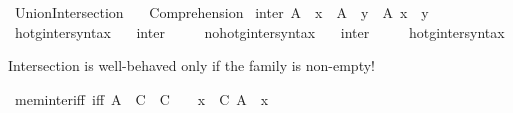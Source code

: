 %
\begin{isabellebody}%
%
%
\isadelimdocument
%
\endisadelimdocument
%
\isatagdocument
\isanewline
\isanewline
%
\isamarkuptrue%
%
\endisatagdocument
{\isafolddocument}%
%
\isadelimdocument
%
\endisadelimdocument
%
\isadelimtheory
%
\endisadelimtheory
%
\isatagtheory
{}\isamarkupfalse%
\ Union{\isacharunderscore}{\kern0pt}Intersection\isanewline
\ \ \ Comprehension\isanewline
{}%
\endisatagtheory
{\isafoldtheory}%
%
\isadelimtheory
\isanewline
%
\endisadelimtheory
\isanewline
{}\isamarkupfalse%
\ {\isachardoublequoteopen}inter\ A\ {\isasymequiv}\ {\isacharbraceleft}{\kern0pt}x\ {\isasymin}\ {\isasymUnion}A\ {\isacharbar}{\kern0pt}\ {\isasymforall}y\ {\isasymin}\ A{\isachardot}{\kern0pt}\ x\ {\isasymin}\ y{\isacharbraceright}{\kern0pt}{\isachardoublequoteclose}\isanewline
\isanewline
{}\isamarkupfalse%
\ hotg{\isacharunderscore}{\kern0pt}inter{\isacharunderscore}{\kern0pt}syntax\ \ \isamarkupfalse%
\ inter\ {\isacharparenleft}{\kern0pt}{\isachardoublequoteopen}{\isasymInter}{\isacharunderscore}{\kern0pt}{\isachardoublequoteclose}\ {\isacharbrackleft}{\kern0pt}{}{}{\isacharbrackright}{\kern0pt}\ {}{}{\isacharparenright}{\kern0pt}\ \isamarkupfalse%
\isanewline
{}\isamarkupfalse%
\ no{\isacharunderscore}{\kern0pt}hotg{\isacharunderscore}{\kern0pt}inter{\isacharunderscore}{\kern0pt}syntax\ \ \isamarkupfalse%
\ inter\ {\isacharparenleft}{\kern0pt}{\isachardoublequoteopen}{\isasymInter}{\isacharunderscore}{\kern0pt}{\isachardoublequoteclose}\ {\isacharbrackleft}{\kern0pt}{}{}{\isacharbrackright}{\kern0pt}\ {}{}{\isacharparenright}{\kern0pt}\ \isamarkupfalse%
\isanewline
{}\isamarkupfalse%
\ hotg{\isacharunderscore}{\kern0pt}inter{\isacharunderscore}{\kern0pt}syntax%
\begin{isamarkuptext}%
Intersection is well-behaved only if the family is non-empty!%
\end{isamarkuptext}\isamarkuptrue%
\isamarkupfalse%
\ mem{\isacharunderscore}{\kern0pt}inter{\isacharunderscore}{\kern0pt}iff\ {\isacharbrackleft}{\kern0pt}iff{\isacharbrackright}{\kern0pt}{\isacharcolon}{\kern0pt}\ {\isachardoublequoteopen}A\ {\isasymin}\ {\isasymInter}C\ {\isasymlongleftrightarrow}\ C\ {\isasymnoteq}\ {\isacharbraceleft}{\kern0pt}{\isacharbraceright}{\kern0pt}\ {\isasymand}\ {\isacharparenleft}{\kern0pt}{\isasymforall}x\ {\isasymin}\ C{\isachardot}{\kern0pt}\ A\ {\isasymin}\ x{\isacharparenright}{\kern0pt}{\isachardoublequoteclose}\isanewline

\end{isabellebody}
